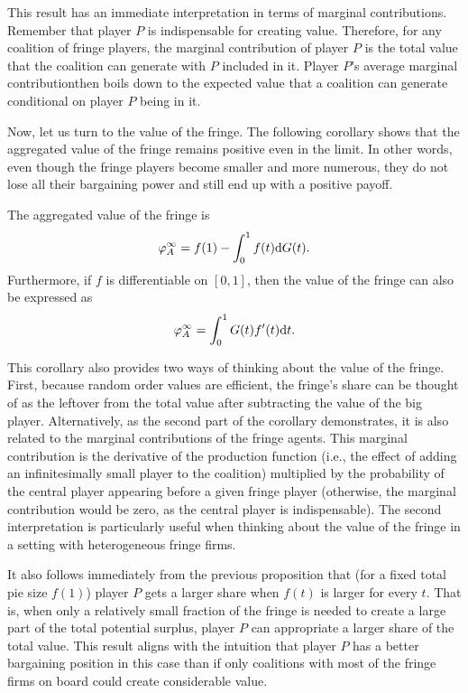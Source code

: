 This result has an immediate interpretation in terms of marginal contributions.
Remember that player $P$ is indispensable for creating value.
Therefore, for any coalition of fringe players, the marginal contribution of player $P$ is the total value that the coalition can generate with $P$ included in it.
Player $P$'s average marginal contributionthen boils down to the expected value that a coalition can generate conditional on player $P$ being in it.

Now, let us turn to the value of the fringe.
The following corollary shows that the aggregated value of the fringe remains positive even in the limit.
In other words, even though the fringe players become smaller and more numerous, they do not lose all their bargaining power and still end up with a positive payoff.
\begin{corollary}
    \label{cor:fringe_value_general}
    The aggregated value of the fringe is
    \begin{align*}
        \varphi_A^\infty = f(1) - \int_0^1 f(t) \mathrm{d}G(t).
    \end{align*}
    Furthermore, if $f$ is differentiable on $[0, 1]$, then the value of the fringe can also be expressed as
    \begin{align*}
        \varphi_A^\infty = \int_0^1 G(t) f'(t) \mathrm{d}t.
    \end{align*}
\end{corollary}

This corollary also provides two ways of thinking about the value of the fringe.
First, because random order values are efficient, the fringe's share can be thought of as the leftover from the total value after subtracting the value of the big player.
Alternatively, as the second part of the corollary demonstrates, it is also related to the marginal contributions of the fringe agents.
This marginal contribution is the derivative of the production function (i.e., the effect of adding an infinitesimally small player to the coalition) multiplied by the probability of the central player appearing before a given fringe player (otherwise, the marginal contribution would be zero, as the central player is indispensable).
The second interpretation is particularly useful when thinking about the value of the fringe in a setting with heterogeneous fringe firms.

It also follows immediately from the previous proposition that (for a fixed total pie size $f(1)$) player $P$ gets a larger share when $f(t)$ is larger for every $t$.
That is, when only a relatively small fraction of the fringe is needed to create a large part of the total potential surplus, player $P$ can appropriate a larger share of the total value.
This result aligns with the intuition that player $P$ has a better bargaining position in this case than if only coalitions with most of the fringe firms on board could create considerable value.

